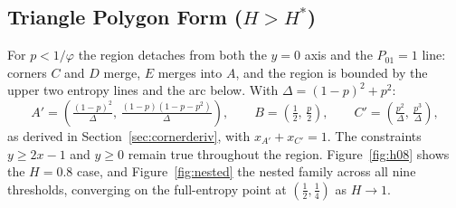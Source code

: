 \documentclass[11pt]{article}
\begin{document}
\subsection{Triangle Polygon Form (\texorpdfstring{$H> H^\ast$}{H > H*})}
For $p<1/\varphi$ the region detaches from both the $y=0$ axis and the
$P_{01}=1$ line: corners $C$ and $D$ merge, $E$ merges into $A$, and the
region is bounded by the upper two entropy lines and the arc below. With
$\Delta=(1-p)^2+p^2$:
\begin{equation}
A' = \left(\tfrac{(1-p)^2}{\Delta},\, \tfrac{(1-p)(1-p-p^2)}{\Delta}\right),\qquad
B = \left(\tfrac12,\,\tfrac{p}{2}\right),\qquad
C' = \left(\tfrac{p^2}{\Delta},\, \tfrac{p^3}{\Delta}\right),
\label{eq:corners3}
\end{equation}
as derived in Section~\ref{sec:cornerderiv}, with $x_{A'}+x_{C'}=1$.
The constraints $y\ge 2x-1$ and $y\ge 0$ remain true throughout the region. Figure~\ref{fig:h08} shows the
$H=0.8$ case, and Figure~\ref{fig:nested} the nested family across all nine
thresholds, converging on the full-entropy point at $(\tfrac12,\tfrac14)$ as
$H\to1$.
\end{document}
